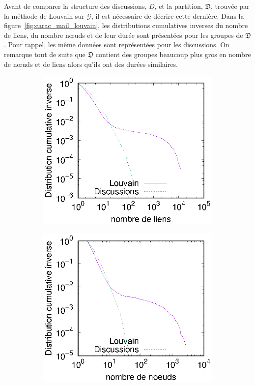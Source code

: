 Avant de comparer la structure des discussions, $D$, et la partition, $\mathfrak{D}$, trouvée par la méthode de Louvain sur $\mathcal{G}$, il est nécessaire de décrire cette dernière.
Dans la figure~\ref{fig:carac_mail_louvain}, les distributions cumulatives inverses du nombre de liens, du nombre n\oe uds et de leur durée sont présentées pour les groupes de $\mathfrak{D}$.
Pour rappel, les même données sont représentées pour les discussions.
On remarque tout de suite que $\mathfrak{D}$ contient des groupes beaucoup plus gros en nombre de n\oe uds et de liens alors qu'ils ont des durées similaires.
\begin{figure}[h]
\centering
	\begin{subfigure}{0.4\textwidth}
		\includegraphics[width=\linewidth]{img/mailing/Detection/linksize}\hfill
		\caption{}		
	\end{subfigure}
	\begin{subfigure}{0.4\textwidth}
		\includegraphics[width=\linewidth]{img/mailing/Detection/nodeSize}\hfill
		\caption{}		
	\end{subfigure}


\end{figure}

